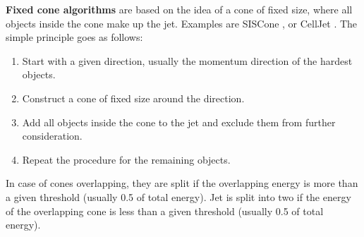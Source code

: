 \textbf{Fixed cone algorithms} are based on the idea of a cone of fixed size, where all objects inside the cone make up the jet.
Examples are SISCone \cite{siscone}, or CellJet \cite{pythia}.
The simple principle goes as follows:
\begin{enumerate}
    \item Start with a given direction, usually the momentum direction of the hardest objects.
    \item Construct a cone of fixed size around the direction.
    \item Add all objects inside the cone to the jet and exclude them from further consideration.
    \item Repeat the procedure for the remaining objects.
\end{enumerate}
In case of cones overlapping, they are split if the overlapping energy is more than a given threshold (usually 0.5 of total energy).
Jet is split into two if the energy of the overlapping cone is less than a given threshold (usually 0.5 of total energy).

